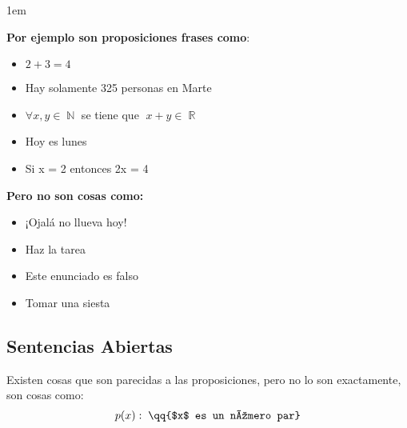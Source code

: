 \documentclass[12pt, fleqn]{report}                             %
\newenvironment{SmallIndentation}[1][0.75em]                    %
        {\begin{adjustwidth}{#1}{}\begin{footnotesize}}             %
        {\end{footnotesize}\end{adjustwidth}}                       %
\newcommand \Quote              {\qq}                           %
\theoremstyle{break}                                            %
\DeclareMathOperator \Naturals     {\mathbb{N}}                 %
\DeclareMathOperator \Reals        {\mathbb{R}}                 %
\begin{document}
                    \begin{multicols}{2}
                    \begin{SmallIndentation}[1em]
                        \textbf{Por ejemplo son proposiciones frases como}:
                        \begin{itemize}
                            \item $2 + 3 = 4$
                            \item Hay solamente 325 personas en Marte
                            \item $\forall x, y \in \Naturals$ se tiene que $\; x+y \in \Reals$
                            \item Hoy es lunes
                            \item Si x = 2 entonces 2x = 4
                        \end{itemize}

                        \textbf{Pero no son cosas como:}
                        \begin{itemize}
                            \item ¡Ojalá no llueva hoy!
                            \item Haz la tarea
                            \item Este enunciado es falso
                            \item Tomar una siesta
                        \end{itemize}
                    
                    \end{SmallIndentation}
                    \end{multicols}



            \clearpage
            \subsection{Sentencias Abiertas}
                Existen cosas que son parecidas a las proposiciones, pero no lo son exactamente,
                son cosas como:
                \begin{equation*}
                    p(x): \; \text{\Quote{$x$ es un número par}}  
                \end{equation*}
\end{document}
